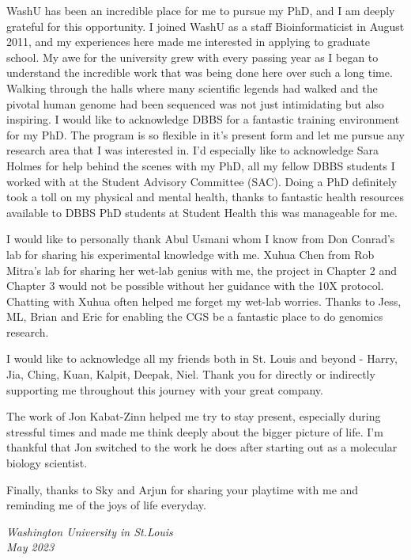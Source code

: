 WashU has been an incredible place for me to pursue my PhD, and I am deeply grateful for this opportunity. I joined WashU as a staff Bioinformaticist in August 2011, and my experiences here made me interested in applying to graduate school. My awe for the university grew with every passing year as I began to understand the incredible work that was being done here over such a long time. Walking through the halls where many scientific legends had walked and the pivotal human genome had been sequenced was not just intimidating but also inspiring. I would like to acknowledge DBBS for a fantastic training environment for my PhD. The program is so flexible in it's present form and let me pursue any research area that I was interested in. I'd especially like to acknowledge Sara Holmes for help behind the scenes with my PhD, all my fellow DBBS students I worked with at the Student Advisory Committee (SAC). Doing a PhD definitely took a toll on my physical and mental health, thanks to fantastic health resources available to DBBS PhD students at Student Health this was manageable for me. 

I would like to personally thank Abul Usmani whom I know from Don Conrad's lab for sharing his experimental knowledge with me. Xuhua Chen from Rob Mitra's lab for sharing her wet-lab genius with me, the project in Chapter 2 and Chapter 3 would not be possible without her guidance with the 10X protocol. Chatting with Xuhua often helped me forget my wet-lab worries. Thanks to Jess, ML, Brian and Eric for enabling the CGS be a fantastic place to do genomics research.

I would like to acknowledge all my friends both in St. Louis and beyond - Harry, Jia, Ching, Kuan, Kalpit, Deepak, Niel. Thank you for directly or indirectly supporting me throughout this journey with your great company.

The work of Jon Kabat-Zinn helped me try to stay present, especially during stressful times and made me think deeply about the bigger picture of life. I'm  thankful that Jon switched to the work he does after starting out as a molecular biology scientist.

Finally, thanks to Sky and Arjun for sharing your playtime with me and reminding me of the joys of life everyday.

\null\hfill \thesisauthor

\noindent
\textit{Washington University in St.\@ Louis}\\
\textit{May 2023}
